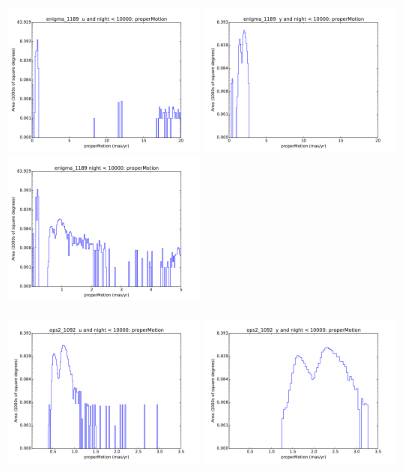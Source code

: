 \begin{figure}[ht]
  \begin{center}
  \includegraphics[width=2.0in]{./figs/milkyway/MW_Astrom_pmError_1189_u_hst.pdf}
  \includegraphics[width=2.0in]{./figs/milkyway/MW_Astrom_pmError_1189_y_hst.pdf}
  \includegraphics[width=2.0in]{./figs/milkyway/MW_Astrom_pmError_1189_10y_hst.pdf}
  \end{center}
  \begin{center}
  \includegraphics[width=2.0in]{./figs/milkyway/MW_Astrom_pmError_1092_u_hst.pdf}
  \includegraphics[width=2.0in]{./figs/milkyway/MW_Astrom_pmError_1092_y_hst.pdf}

\end{center}
\end{figure}
